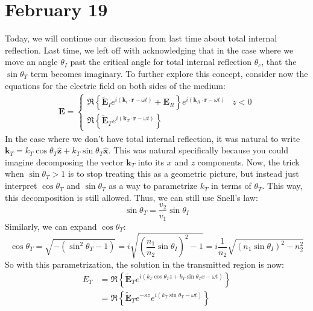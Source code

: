 \section{February 19}

Today, we will continue our discussion from last time about total internal reflection. Last time, we left off
with acknowledging that in the case where we move an angle \( \theta_I \) past the critical angle for total
internal reflection \( \theta_c \), that the \( \sin\theta_T \) term becomes imaginary. To further explore
this concept, consider now the
equations for the electric field on both sides of the medium:
\begin{align*}
	\mathbf{E} = \begin{cases}
		\Re\left\{ \tilde{\mathbf{E}}_I e^{i (\mathbf{k}_i \cdot \mathbf{r} - \omega t)} + \mathbf{E}_R
		\right\}e^{i(\mathbf{k}_R \cdot \mathbf{r} - \omega t)} & z < 0\\
		\Re\left\{ \tilde{\mathbf{E}}_{T} e^{i(\mathbf{k}_T \cdot \mathbf{r} - \omega t)} \right\}
	\end{cases}
\end{align*}
In the case where we don't have total internal reflection, it was natural to write \( \mathbf{k}_T = k_T \cos
\theta_T \mathbf{\hat{z}} + k_T \sin \theta_T \mathbf{\hat{x}} \). This was natural specifically because you
could imagine decomposing the vector \( \mathbf{k}_T \) into its \( x \) and \( z \) components. Now, the
trick when \( \sin \theta_T > 1 \) is to stop treating this as a geometric picture, but instead just
interpret \( \cos \theta_T \) and \( \sin \theta_T \) as a way to parametrize \( k_T \) in terms of \(
\theta_T \). This way, this decomposition is still allowed. Thus, we can still use Snell's law:
\[
	\sin \theta_T = \frac{v_2}{v_1} \sin \theta_I
\]
Similarly, we can expand \( \cos \theta_T \):
\begin{equation}
	\label{12:cos-imaginary}
	\cos \theta_T = \sqrt{-(\sin^2 \theta_T - 1)} = i \sqrt{\left( \frac{n_1}{n_2} \sin \theta_I \right)^2 -
	1} = i \frac{1}{n_2}\sqrt{(n_1 \sin \theta_I)^2 - n_2^2}
\end{equation}
So with this parametrization, the solution in the transmitted region is now:
\begin{align}
	E_T &= \Re\left\{ \tilde{\mathbf{E}}_T e^{i ( k_T \cos \theta_T z + k_T \sin \theta_T x - \omega t)} \right\}\\
	\label{12:ET}&= \Re\left\{ \tilde{\mathbf{E}}_T e^{-\kappa z} e^{i (k_T \sin \theta_T - \omega t)} \right\} 
\end{align}
